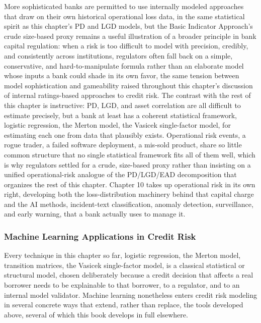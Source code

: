 \documentclass[../ai_in_finance]{subfiles}
\begin{document}
More sophisticated banks are permitted to use internally modeled approaches that draw on their own historical operational loss data, in the same statistical spirit as this chapter's PD and LGD models, but the Basic Indicator Approach's crude size-based proxy remains a useful illustration of a broader principle in bank capital regulation: when a risk is too difficult to model with precision, credibly, and consistently across institutions, regulators often fall back on a simple, conservative, and hard-to-manipulate formula rather than an elaborate model whose inputs a bank could shade in its own favor, the same tension between model sophistication and gameability raised throughout this chapter's discussion of internal ratings-based approaches to credit risk.
The contrast with the rest of this chapter is instructive: PD, LGD, and asset correlation are all difficult to estimate precisely, but a bank at least has a coherent statistical framework, logistic regression, the Merton model, the Vasicek single-factor model, for estimating each one from data that plausibly exists.
Operational risk events, a rogue trader, a failed software deployment, a mis-sold product, share so little common structure that no single statistical framework fits all of them well, which is why regulators settled for a crude, size-based proxy rather than insisting on a unified operational-risk analogue of the PD/LGD/EAD decomposition that organizes the rest of this chapter. Chapter 10 takes up operational risk in its own right, developing both the loss-distribution machinery behind that capital charge and the AI methods, incident-text classification, anomaly detection, surveillance, and early warning, that a bank actually uses to manage it.

\subsubsection*{Machine Learning Applications in Credit Risk}

Every technique in this chapter so far, logistic regression, the Merton model, transition matrices, the Vasicek single-factor model, is a classical statistical or structural model, chosen deliberately because a credit decision that affects a real borrower needs to be explainable to that borrower, to a regulator, and to an internal model validator. Machine learning nonetheless enters credit risk modeling in several concrete ways that extend, rather than replace, the tools developed above, several of which this book develops in full elsewhere.
\end{document}
